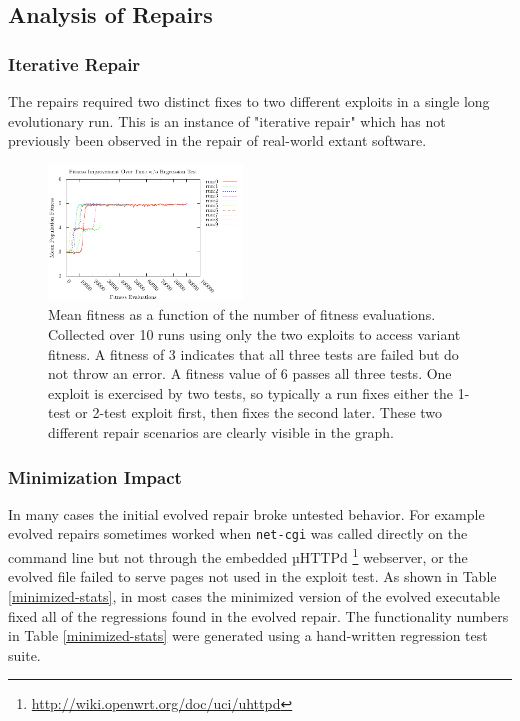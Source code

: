 \documentclass{sigcomm-alternate}
\begin{document}
\subsection{Analysis of Repairs}
\label{sec-4-2}

\subsubsection{Iterative Repair}
\label{sec-4-2-1}
The repairs required two distinct fixes to two different exploits in a
single long evolutionary run.  This is an instance of "iterative
repair" which has not previously been observed in the repair of
real-world extant software.

\begin{figure}[htb]
  \centering
  \includegraphics[width=0.46\textwidth]{fitness-improvement.pdf}
  \caption{Mean fitness as a function of the number of fitness
    evaluations.  Collected over 10 runs using only the two exploits
    to access variant fitness.  A fitness of 3 indicates that all
    three tests are failed but do not throw an error.  A fitness value
    of 6 passes all three tests.  One exploit is exercised by two
    tests, so typically a run fixes either the 1-test or 2-test
    exploit first, then fixes the second later.  These two different
    repair scenarios are clearly visible in the graph.}
  \label{fit-by-time}
\end{figure}

\subsubsection{Minimization Impact}
\label{sec-4-2-2}
In many cases the initial evolved repair broke untested behavior.  For
example evolved repairs sometimes worked when \texttt{net-cgi} was
called directly on the command line but not through the embedded
µHTTPd \footnote{\url{http://wiki.openwrt.org/doc/uci/uhttpd}}
webserver, or the evolved file failed to serve pages not used in the
exploit test.  As shown in Table \ref{minimized-stats}, in most cases
the minimized version of the evolved executable fixed all of the
regressions found in the evolved repair.  The functionality numbers in
Table \ref{minimized-stats} were generated using a hand-written
regression test suite.
\end{document}
